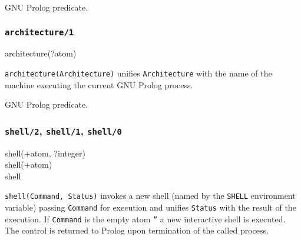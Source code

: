 \Portability

GNU Prolog predicate.

\subsubsection{\texttt{architecture/1}}

\begin{TemplatesOneCol}
architecture(?atom)

\end{TemplatesOneCol}

\Description

\texttt{architecture(Architecture)} unifies \texttt{Architecture} with the
name of the machine executing the current GNU Prolog process.

\begin{PlErrors}



\end{PlErrors}

\Portability

GNU Prolog predicate.

\subsubsection{\texttt{shell/2},
               \texttt{shell/1},
               \texttt{shell/0}}

\begin{TemplatesOneCol}
shell(+atom, ?integer)\\
shell(+atom)\\
shell

\end{TemplatesOneCol}

\Description

\texttt{shell(Command, Status)} invokes a new shell (named by the
\texttt{SHELL} environment variable) passing \texttt{Command} for execution
and unifies \texttt{Status} with the result of the execution. If
\texttt{Command} is the empty atom \texttt{''} a new interactive shell is
executed. The control is returned to Prolog upon termination of the called
process.

